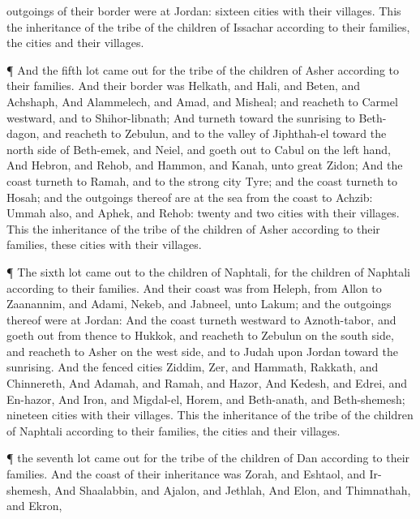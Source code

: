 {outgoings of their
border were at
Jordan:
sixteen
cities with their
villages.
This
{} the
inheritance of the
tribe of the
children of
Issachar according to their
families, the
cities and their
villages.
\par }{\PP {}¶ And the
fifth
lot came
out for the
tribe of the
children of
Asher according to their
families.
And their
border was
Helkath, and
Hali, and
Beten, and
Achshaph,
And
Alammelech, and
Amad, and
Misheal; and
reacheth to
Carmel
westward, and to
Shihor-libnath;
And
turneth toward the
sunrising to
Beth-dagon, and
reacheth to
Zebulun, and to the
valley of
Jiphthah-el toward the north
side of
Beth-emek, and
Neiel, and goeth
out to
Cabul on the left
hand,
And
Hebron, and
Rehob, and
Hammon, and
Kanah,
{} unto
great
Zidon;
And
{} the
coast
turneth to
Ramah, and to the
strong
city
Tyre; and the
coast
turneth to
Hosah; and the
outgoings thereof are at the
sea from the
coast to
Achzib:
Ummah also, and
Aphek, and
Rehob:
twenty and
two
cities with their
villages.
This
{} the
inheritance of the
tribe of the
children of
Asher according to their
families, these
cities with their
villages.
\par }{\PP {}¶ The
sixth
lot came
out to the
children of
Naphtali,
{} for the
children of
Naphtali according to their
families.
And their
coast was from
Heleph, from
Allon to
Zaanannim, and
Adami,
Nekeb, and
Jabneel, unto
Lakum; and the
outgoings thereof were at
Jordan:
And
{} the
coast
turneth
westward to
Aznoth-tabor, and goeth
out from thence to
Hukkok, and
reacheth to
Zebulun on the south
side, and
reacheth to
Asher on the west
side, and to
Judah upon
Jordan toward the
sunrising.
And the
fenced
cities
{}
Ziddim,
Zer, and
Hammath,
Rakkath, and
Chinnereth,
And
Adamah, and
Ramah, and
Hazor,
And
Kedesh, and
Edrei, and
En-hazor,
And
Iron, and
Migdal-el,
Horem, and
Beth-anath, and
Beth-shemesh;
nineteen
cities with their
villages.
This
{} the
inheritance of the
tribe of the
children of
Naphtali according to their
families, the
cities and their
villages.
\par }{\PP {}¶
{} the
seventh
lot came
out for the
tribe of the
children of
Dan according to their
families.
And the
coast of their
inheritance was
Zorah, and
Eshtaol, and
Ir-shemesh,
And
Shaalabbin, and
Ajalon, and
Jethlah,
And
Elon, and
Thimnathah, and
Ekron,
}
